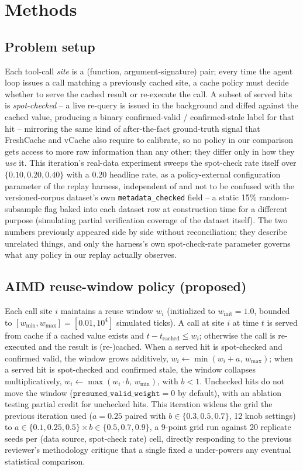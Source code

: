 \documentclass[11pt,letterpaper]{article}
\begin{document}
\section{Methods}

\subsection{Problem setup}

Each tool-call \emph{site} is a (function, argument-signature) pair; every time the agent loop issues a call
matching a previously cached site, a cache policy must decide whether to serve the cached result or
re-execute the call. A subset of served hits is \emph{spot-checked} -- a live re-query is issued in the
background and diffed against the cached value, producing a binary confirmed-valid / confirmed-stale label
for that hit -- mirroring the same kind of after-the-fact ground-truth signal that FreshCache and vCache
also require to calibrate, so no policy in our comparison gets access to more raw information than any
other; they differ only in how they \emph{use} it. This iteration's real-data experiment sweeps the spot-check
rate itself over $\{0.10, 0.20, 0.40\}$ with a 0.20 headline rate, as a policy-external configuration parameter
of the replay harness, independent of and not to be confused with the versioned-corpus dataset's own
\texttt{metadata\_checked} field -- a static 15\% random-subsample flag baked into each dataset row at construction
time for a different purpose (simulating partial verification coverage of the dataset itself). The two
numbers previously appeared side by side without reconciliation; they describe unrelated things, and only
the harness's own spot-check-rate parameter governs what any policy in our replay actually observes.

\subsection{AIMD reuse-window policy (proposed)}

Each call site $i$ maintains a reuse window $w_i$ (initialized to $w_{\text{init}}=1.0$, bounded to
$[w_{\min}, w_{\max}] = [0.01, 10^4]$ simulated ticks). A call at site $i$ at time $t$ is served from cache
if a cached value exists and $t - t_{\text{cached}} \le w_i$; otherwise the call is re-executed and the
result is (re-)cached. When a served hit is spot-checked and confirmed valid, the window grows additively,
$w_i \leftarrow \min(w_i + a,\, w_{\max})$; when a served hit is spot-checked and confirmed stale, the
window collapses multiplicatively, $w_i \leftarrow \max(w_i \cdot b,\, w_{\min})$, with $b < 1$. Unchecked
hits do not move the window ($\texttt{presumed\_valid\_weight}=0$ by default), with an ablation testing
partial credit for unchecked hits. This iteration widens the grid the previous iteration used ($a=0.25$
paired with $b\in\{0.3,0.5,0.7\}$, 12 knob settings) to $a\in\{0.1,0.25,0.5\}\times b\in\{0.5,0.7,0.9\}$, a
9-point grid run against 20 replicate seeds per (data source, spot-check rate) cell, directly responding to
the previous reviewer's methodology critique that a single fixed $a$ under-powers any eventual statistical
comparison.
\end{document}
